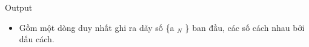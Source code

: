 Output
\begin{itemize}
	\item     Gồm một dòng duy nhất ghi ra dãy số \{a    $_     N    $    \} ban đầu, các số cách nhau bởi dấu cách.   
\end{itemize}